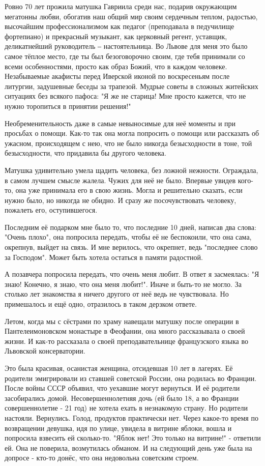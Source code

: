 Ровно 70 лет прожила матушка Гавриила среди нас, подарив окружающим мегатонны
любви, обогатив наш общий мир своим сердечным теплом, радостью, высочайшим
профессионализмом как педагог (преподавала в педучилище фортепиано) и
прекрасный музыкант, как церковный регент, уставщик, деликатнейший руководитель
‒ настоятельница. Во Львове для меня это было самое тёплое место, где ты был
безоговорочно своим, где тебя принимали со всеми особенностями, просто как
образ Божий, что в каждом человеке. Незабываемые акафисты перед Иверской иконой
по воскресеньям после литургии, задушевные беседы за трапезой. Мудрые советы в
сложных житейских ситуациях без всякого пафоса: "Я же не старица! Мне просто
кажется, что не нужно торопиться в принятии решения!" 

Необременительность даже в самые невыносимые для неё моменты и при просьбах о
помощи. Как-то так она могла попросить о помощи или рассказать об ужасном,
происходящем с нею, что не было никогда безысходности в тоне, той
безысходности, что придавила бы другого человека. 

Матушка удивительно умела щадить человека, без ложной нежности. Ограждала, в
самом лучшем смысле жалела. Чужих для неё не было. Впервые увидев кого-то, она
уже принимала его в свою жизнь. Могла и решительно сказать, если нужно было, но
никогда не обидно. И сразу же посочувствовать человеку, пожалеть его,
оступившегося.  

Последним её подарком мне было то, что последние 10 дней, написав два слова:
"Очень плохо", она попросила передать, чтобы её не беспокоили, что она сама,
окрепнув, выйдет на связь. И мне верилось, что окрепнет, ведь "последнее слово
за Господом". Может быть хотела остаться в памяти радостной. 

А позавчера попросила передать, что очень меня любит. В ответ я засмеялась: "Я
знаю! Конечно, я знаю, что она меня любит!". Иначе и быть-то не могло. За
столько лет знакомства я ничего другого от неё ведь не чувствовала. Но
примешалось и ещё одно, отразилось в таком дерзком ответе.

Летом, когда мы с сёстрами по храму навещали матушку после операции в
Пантелеимоновском монастыре в Феофании,  она много рассказывала о своей жизни.
И как-то рассказала о своей преподавательнице французского языка во Львовской
консерватории. 

Это была красивая, осанистая женщина, отсидевшая 10 лет в лагерях. Её родители
эмигрировали из ставшей советской России, она родилась во Франции. После войны
СССР объявил, что уехавшие могут вернуться. И её родители засобирались домой.
Несовершеннолетняя дочь (ей было 18, а во Франции совершеннолетие - 21 год) не
хотела ехать в незнакомую страну. Но родители настояли. Вернулись. Голод,
продуктов практически нет. Через какое-то время по возвращении девушка, идя по
улице, увидела в витрине яблоки, вошла и попросила взвесить ей сколько-то.
"Яблок нет! Это только на витрине!" - ответили ей. Она не поверила, возмутилась
обманом. И на следующий день уже была на допросе - кто-то донёс, что она
недовольна советским строем. 

